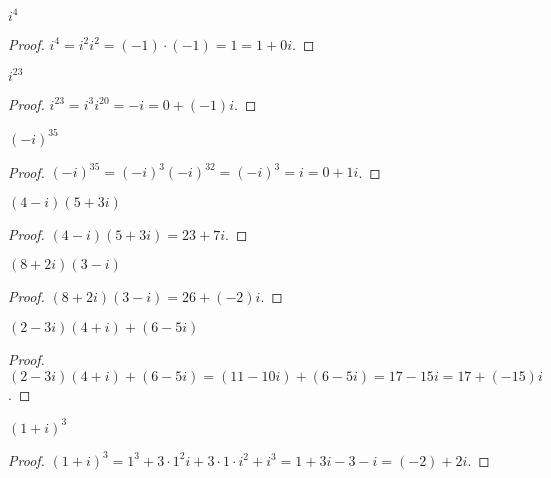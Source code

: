\begin{exercise}
    $i^{4}$
\end{exercise}

\begin{proof}
    $i^{4} = {i}^{2}{i}^{2} = (-1)\cdot (-1) = 1 = 1 + 0i$.
\end{proof}

\begin{exercise}
    $i^{23}$
\end{exercise}

\begin{proof}
    $i^{23} = {i}^{3}{i}^{20} = -i = 0 + (-1)i$.
\end{proof}

\begin{exercise}
    ${(-i)}^{35}$
\end{exercise}

\begin{proof}
    ${(-i)}^{35} = {(-i)}^{3}{(-i)}^{32} = {(-i)}^{3} = i = 0 + 1i$.
\end{proof}

\begin{exercise}
    $(4 - i)(5 + 3i)$
\end{exercise}

\begin{proof}
    $(4 - i)(5 + 3i) = 23 + 7i$.
\end{proof}

\begin{exercise}
    $(8 + 2i)(3 - i)$
\end{exercise}

\begin{proof}
    $(8 + 2i)(3 - i) = 26 + (-2)i$.
\end{proof}

\begin{exercise}
    $(2 - 3i)(4 + i) + (6 - 5i)$
\end{exercise}

\begin{proof}
    $(2 - 3i)(4 + i) + (6 - 5i) = (11 - 10i) + (6 - 5i) = 17 - 15i = 17 + (-15)i$.
\end{proof}

\begin{exercise}
    ${(1+i)}^{3}$
\end{exercise}

\begin{proof}
    ${(1+i)}^{3} = 1^{3} + 3\cdot 1^{2}i + 3\cdot 1\cdot i^{2} + i^{3} = 1 + 3i - 3 - i = (-2) + 2i$.
\end{proof}

